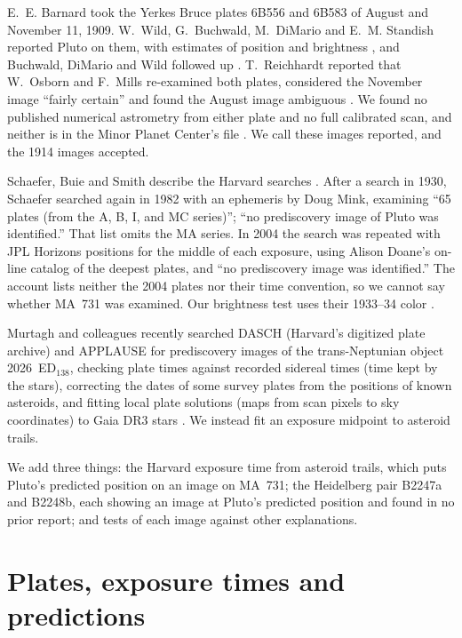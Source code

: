 \documentclass[11pt]{article}
\begin{document}
E.~E. Barnard took the Yerkes Bruce plates 6B556 and 6B583 of August and November 11, 1909. W.~Wild, G.~Buchwald, M.~DiMario and E.~M. Standish reported Pluto on them, with estimates of position and brightness \cite{Wild1998}, and Buchwald, DiMario and Wild followed up \cite{Buchwald2000}. T.~Reichhardt reported that W.~Osborn and F.~Mills re-examined both plates, considered the November image ``fairly certain'' and found the August image ambiguous \cite{Reichhardt2015}. We found no published numerical astrometry from either plate and no full calibrated scan, and neither is in the Minor Planet Center's file \cite{MPC}. We call these images reported, and the 1914 images accepted.

Schaefer, Buie and Smith describe the Harvard searches \cite[Section~6]{Schaefer2008}. After a search in 1930, Schaefer searched again in 1982 with an ephemeris by Doug Mink, examining ``65 plates (from the A, B, I, and MC series)''; ``no prediscovery image of Pluto was identified.'' That list omits the MA series. In 2004 the search was repeated with JPL Horizons positions for the middle of each exposure, using Alison Doane's on-line catalog of the deepest plates, and ``no prediscovery image was identified.'' The account lists neither the 2004 plates nor their time convention, so we cannot say whether MA~731 was examined. Our brightness test uses their 1933--34 color \cite[Section~3]{Schaefer2008}.

Murtagh and colleagues recently searched DASCH (Harvard's digitized plate archive) and APPLAUSE for prediscovery images of the trans-Neptunian object 2026~ED$_{138}$, checking plate times against recorded sidereal times (time kept by the stars), correcting the dates of some survey plates from the positions of known asteroids, and fitting local plate solutions (maps from scan pixels to sky coordinates) to Gaia DR3 stars \cite[Section~2.1]{Murtagh2026}. We instead fit an exposure midpoint to asteroid trails.

We add three things: the Harvard exposure time from asteroid trails, which puts Pluto's predicted position on an image on MA~731; the Heidelberg pair B2247a and B2248b, each showing an image at Pluto's predicted position and found in no prior report; and tests of each image against other explanations.

\section{Plates, exposure times and predictions}
\label{sec:plates}
\end{document}
